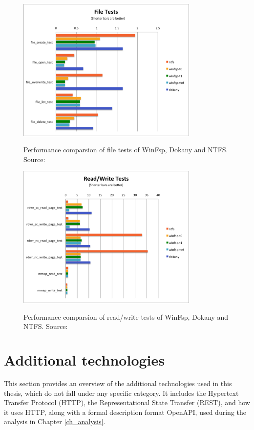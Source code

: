 \begin{figure}[H]
	\centering
	\includegraphics[width=0.8\textwidth,keepaspectratio]{obrazky-figures/file_tests.pdf}
	\label{winfsp_write_tests}
	\caption{Performance comparsion of file tests of WinFsp, Dokany and NTFS. Source:\cite{GitWinFsp}}
	\bigskip
	\includegraphics[width=0.8\textwidth,keepaspectratio]{obrazky-figures/rdwr_tests.pdf}
	\label{winfsp_file_tests}
	\caption{Performance comparsion of read/write tests of WinFsp, Dokany and NTFS. Source:\cite{GitWinFsp}}
\end{figure}

\section{Additional technologies}
This section provides an overview of the additional technologies used in this thesis, which do not fall under any specific category. It includes the Hypertext Transfer Protocol (HTTP), the Representational State Transfer (REST), and how it uses HTTP, along with a formal description format OpenAPI, used during the analysis in Chapter \ref{ch_analysis}. 

